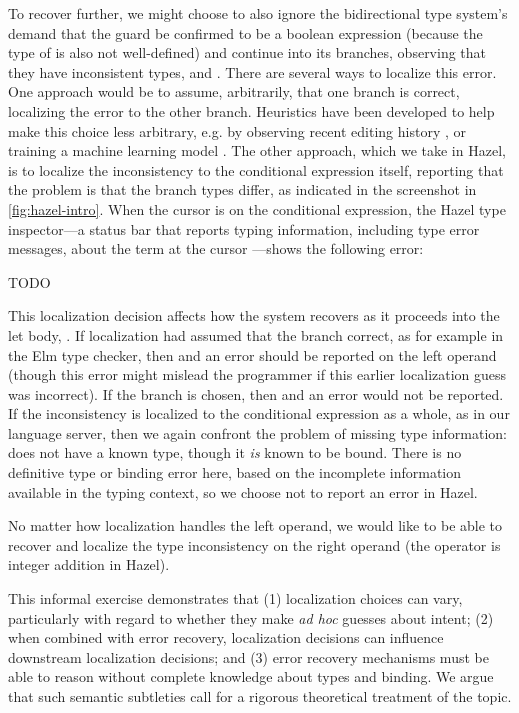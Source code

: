 To recover further, we might choose to also ignore the bidirectional type system's demand that the guard be confirmed to be a boolean expression 
(because the type of  is also not well-defined) 
and continue into its branches, observing that they have inconsistent types,  and . 
There are several ways to localize this error. 
One approach would be to assume, arbitrarily, that one branch is correct, localizing the error to the other branch. 
Heuristics have been developed to help make this choice less arbitrary, e.g. 
by observing recent editing history , 
or training a machine learning model . 
The other approach, which we take in Hazel, is to localize the inconsistency to the conditional expression itself, reporting that the problem is that the branch types differ, as indicated in
the screenshot in \autoref{fig:hazel-intro}. When the cursor is on the conditional expression, the Hazel type inspector---a status bar that reports typing information, including type error messages, about the term at the cursor \cite{hannah1}---shows the following error:

TODO

This localization decision affects how the system recovers as it proceeds into the let body, . 
If localization had assumed that the  branch correct, as for example in the Elm type checker, then  and an error should be reported on the left operand (though this error might mislead the programmer if this earlier localization guess was incorrect).
If the  branch is chosen, then  and an error would not be reported. 
If the inconsistency is localized to the conditional expression as a whole, as in our language server, then we again confront the problem of missing type information: 
 does not have a known type,
though it \emph{is} known to be bound. 
There is no definitive type or binding error here, based on the incomplete information available in the typing context, 
so we choose not to report an error in Hazel.

No matter how localization handles the left operand, we would like to be able to recover and 
localize the type inconsistency on the right operand (the \li{+} operator is integer addition in Hazel).

This informal exercise demonstrates that (1) localization choices can vary, particularly with regard to whether they make \emph{ad hoc} guesses about intent;  
(2) when combined with error recovery, localization decisions can influence downstream localization decisions; and 
(3) error recovery mechanisms must be able to reason without complete knowledge about types and binding. We argue that such semantic subtleties call for a rigorous theoretical treatment of the topic.

